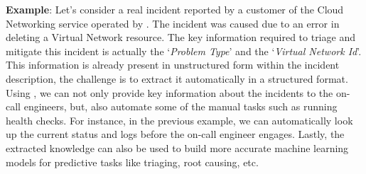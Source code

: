 \textbf{Example}: Let's consider a real incident reported by a customer of the Cloud Networking service operated by \CompanyX{}. The incident was caused due to an error in deleting a Virtual Network resource. The key information required to triage and mitigate this incident is actually the `\textit{Problem Type}' and the `\textit{Virtual Network Id}'. This information is already present in unstructured form within the incident description, the challenge is to extract it automatically in a structured format. Using \softner{}, we can not only provide key information about the incidents to the on-call engineers, but, also automate some of the manual tasks such as running health checks. For instance, in the previous example, we can automatically look up the current status and logs before the on-call engineer engages. Lastly, the extracted knowledge can also be used to build more accurate machine learning models for predictive tasks like triaging, root causing, etc.